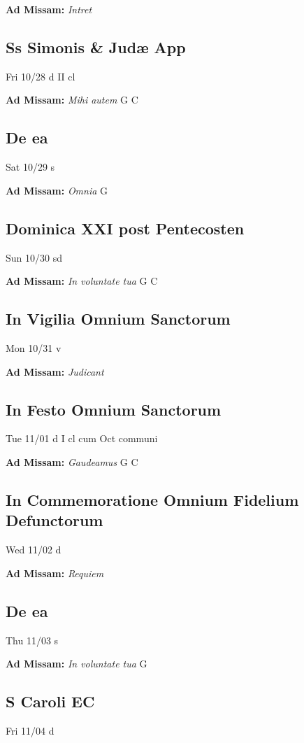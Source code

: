 \documentclass[letterpaper, 10pt, twocolumn]{article}
\begin{document}
\textbf{Ad Missam:} \textit{Intret} 

\subsection*{Ss Simonis \& Judæ App}Fri 10/28 d II cl

\textbf{Ad Missam:} \textit{Mihi autem} G C 

\subsection*{De ea}Sat 10/29 s

\textbf{Ad Missam:} \textit{Omnia} G 

\subsection*{Dominica XXI post Pentecosten}Sun 10/30 sd

\textbf{Ad Missam:} \textit{In voluntate tua} G C 

\subsection*{In Vigilia Omnium Sanctorum}Mon 10/31 v

\textbf{Ad Missam:} \textit{Judicant} 

\subsection*{In Festo Omnium Sanctorum}Tue 11/01 d I cl cum Oct communi

\textbf{Ad Missam:} \textit{Gaudeamus} G C 

\subsection*{In Commemoratione Omnium Fidelium Defunctorum}Wed 11/02 d

\textbf{Ad Missam:} \textit{Requiem} 

\subsection*{De ea}Thu 11/03 s

\textbf{Ad Missam:} \textit{In voluntate tua} G 

\subsection*{S Caroli EC}Fri 11/04 d
\end{document}
